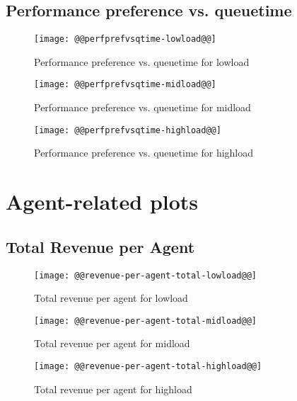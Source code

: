 \documentclass[11pt]{article}
\begin{document}
\newpage
\subsection{Performance preference vs. queuetime}
\begin{figure}[htbp]
  \begin{center}
    \texttt{[image: @@perfprefvsqtime-lowload@@]}
    \caption{Performance preference vs. queuetime for lowload}
    \label{fig:perfprefvsqtime-lowload}
  \end{center}
\end{figure}
\begin{figure}[htbp]
  \begin{center}
    \texttt{[image: @@perfprefvsqtime-midload@@]}
    \caption{Performance preference vs. queuetime for midload}
    \label{fig:perfprefvsqtime-midload}
  \end{center}
\end{figure}
\begin{figure}[htbp]
  \begin{center}
    \texttt{[image: @@perfprefvsqtime-highload@@]}
    \caption{Performance preference vs. queuetime for highload}
    \label{fig:perfprefvsqtime-highload}
  \end{center}
\end{figure}

\newpage
\section{Agent-related plots}
\subsection{Total Revenue per Agent}
\begin{figure}[htbp]
  \begin{center}
    \texttt{[image: @@revenue-per-agent-total-lowload@@]}
    \caption{Total revenue per agent for lowload}
    \label{fig:revenue-per-agent-total-lowload}
  \end{center}
\end{figure}
\begin{figure}[htbp]
  \begin{center}
    \texttt{[image: @@revenue-per-agent-total-midload@@]}
    \caption{Total revenue per agent for midload}
    \label{fig:revenue-per-agent-total-midload}
  \end{center}
\end{figure}
\begin{figure}[htbp]
  \begin{center}
    \texttt{[image: @@revenue-per-agent-total-highload@@]}
    \caption{Total revenue per agent for highload}
    \label{fig:revenue-per-agent-total-highload}
  \end{center}
\end{figure}
\end{document}
